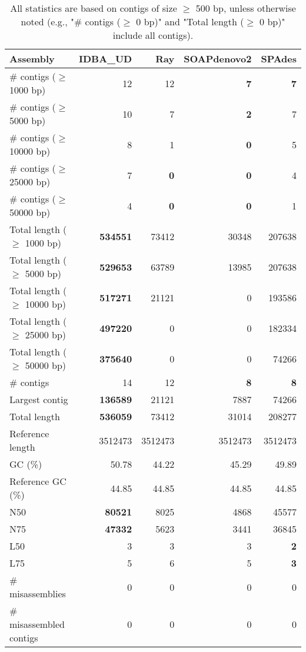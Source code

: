 \documentclass[12pt,a4paper]{article}
\begin{document}
\begin{table}[ht]
\begin{center}
\caption{All statistics are based on contigs of size $\geq$ 500 bp, unless otherwise noted (e.g., "\# contigs ($\geq$ 0 bp)" and "Total length ($\geq$ 0 bp)" include all contigs).}
\begin{tabular}{|l*{4}{|r}|}
\hline
Assembly & IDBA\_UD & Ray & SOAPdenovo2 & SPAdes \\ \hline
\# contigs ($\geq$ 1000 bp) & 12 & 12 & {\bf 7} & {\bf 7} \\ \hline
\# contigs ($\geq$ 5000 bp) & 10 & 7 & {\bf 2} & 7 \\ \hline
\# contigs ($\geq$ 10000 bp) & 8 & 1 & {\bf 0} & 5 \\ \hline
\# contigs ($\geq$ 25000 bp) & 7 & {\bf 0} & {\bf 0} & 4 \\ \hline
\# contigs ($\geq$ 50000 bp) & 4 & {\bf 0} & {\bf 0} & 1 \\ \hline
Total length ($\geq$ 1000 bp) & {\bf 534551} & 73412 & 30348 & 207638 \\ \hline
Total length ($\geq$ 5000 bp) & {\bf 529653} & 63789 & 13985 & 207638 \\ \hline
Total length ($\geq$ 10000 bp) & {\bf 517271} & 21121 & 0 & 193586 \\ \hline
Total length ($\geq$ 25000 bp) & {\bf 497220} & 0 & 0 & 182334 \\ \hline
Total length ($\geq$ 50000 bp) & {\bf 375640} & 0 & 0 & 74266 \\ \hline
\# contigs & 14 & 12 & {\bf 8} & {\bf 8} \\ \hline
Largest contig & {\bf 136589} & 21121 & 7887 & 74266 \\ \hline
Total length & {\bf 536059} & 73412 & 31014 & 208277 \\ \hline
Reference length & 3512473 & 3512473 & 3512473 & 3512473 \\ \hline
GC (\%) & 50.78 & 44.22 & 45.29 & 49.89 \\ \hline
Reference GC (\%) & 44.85 & 44.85 & 44.85 & 44.85 \\ \hline
N50 & {\bf 80521} & 8025 & 4868 & 45577 \\ \hline
N75 & {\bf 47332} & 5623 & 3441 & 36845 \\ \hline
L50 & 3 & 3 & 3 & {\bf 2} \\ \hline
L75 & 5 & 6 & 5 & {\bf 3} \\ \hline
\# misassemblies & 0 & 0 & 0 & 0 \\ \hline
\# misassembled contigs & 0 & 0 & 0 & 0 \\ \hline

\end{tabular}
\end{center}
\end{table}
\end{document}
